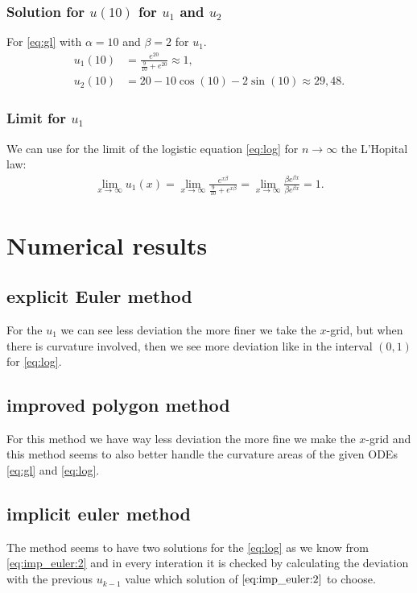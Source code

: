 \documentclass[
paper=A4,fontsize=12pt,
BCOR=15mm,DIV=22,
headinclude=true,footinclude=false,
parskip=full,
numbers=noendperiod,
ngerman,fleqn,             %
bibliography=totoc, %
toc=listof, %
cleardoublepage=empty,      %
version = last
]{scrartcl}
\begin{document}
\subsubsection*{Solution for $u(10)$ for $u_1$ and $u_2$}
For \eqref{eq:gl} with $\alpha = 10$ and $\beta = 2$ for $u_1$.
\begin{align}
	u_1(10) &= \frac{e^{20}}{\frac{9}{10} + e^{20}} \approx 1, \label{eq:u_1:bound}\\
	u_2(10) &= 20 -10\cos(10) - 2 \sin(10) \approx 29,48. \label{eq:u_2_bound}
\end{align}
\subsubsection*{Limit for $u_1$} We can use for the limit of the logistic equation \eqref{eq:log} for $n \to \infty$ the L'Hopital law:
\begin{align}
	\lim_{x \to \infty} u_1(x) = \lim_{x \to \infty} \frac{e^{x\beta}}{\frac{9}{10} + e^{x\beta}} = \lim_{x \to \infty} \frac{\beta e^{\beta x}}{\beta e^{\beta x}} = 1.
\end{align}
\section{Numerical results}
\subsection*{explicit Euler method}
	For the $u_1$ we can see less deviation the more finer we take the $x$-grid, but when there is curvature involved, then we see more deviation like in the interval $(0,1)$ for \eqref{eq:log}.
\subsection*{improved polygon method}
	For this method we have way less deviation the more fine we make the $x$-grid and this method seems to also better handle the curvature areas of the given ODEs \eqref{eq:gl} and \eqref{eq:log}.
\subsection*{implicit euler method}
	The method seems to have two solutions for the \eqref{eq:log} as we know from \eqref{eq:imp_euler:2} and in every interation it is checked by calculating the deviation with the previous $u_{k-1}$ value which solution of $\eqref{eq:imp_euler:2}$ to choose.
\end{document}
